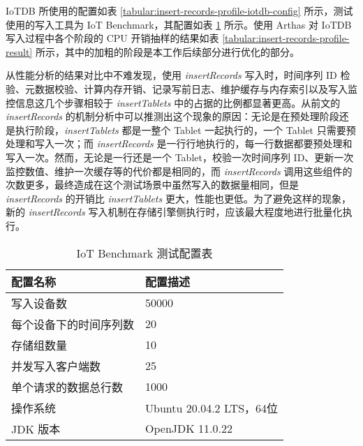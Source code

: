 IoTDB 所使用的配置如表 \ref{tabular:insert-records-profile-iotdb-config} 所示，测试使用的写入工具为 IoT Benchmark\cite{liu2019benchmarking}，其配置如表 \ref{tabular:insert-records-profile-benchmark-config} 所示。使用 Arthas 对 IoTDB 写入过程中各个阶段的 CPU 开销抽样的结果如表 \ref{tabular:insert-records-profile-result} 所示，其中的加粗的阶段是本工作后续部分进行优化的部分。

从性能分析的结果对比中不难发现，使用 \emph{insertRecords} 写入时，时间序列 ID 检验、元数据校验、计算内存开销、记录写前日志、维护缓存与内存索引以及写入监控信息这几个步骤相较于 \emph{insertTablets} 中的占据的比例都显著更高。从前文的 \emph{insertRecords} 的机制分析中可以推测出这个现象的原因：无论是在预处理阶段还是执行阶段，\emph{insertTablets} 都是一整个 Tablet 一起执行的，一个 Tablet 只需要预处理和写入一次；而 \emph{insertRecords} 是一行行地执行的，每一行数据都要预处理和写入一次。然而，无论是一行还是一个 Tablet，校验一次时间序列 ID、更新一次监控数值、维护一次缓存等的代价都是相同的，而 \emph{insertRecords} 调用这些组件的次数更多，最终造成在这个测试场景中虽然写入的数据量相同，但是 \emph{insertRecords} 的开销比 \emph{insertTablets} 更大，性能也更低。为了避免这样的现象，新的 \emph{insertRecords} 写入机制在存储引擎侧执行时，应该最大程度地进行批量化执行。
\begin{table}
  \caption{IoT Benchmark 测试配置表}
  \centering
  \begin{tabular}{ll}
  \toprule
  配置名称 & 配置描述 \\
  \midrule
      写入设备数 &  50000 \\ 
      每个设备下的时间序列数 & 20 \\ 
      存储组数量 & 10 \\ 
      并发写入客户端数 & 25 \\ 
      单个请求的数据总行数 &  1000 \\ 
      操作系统 & Ubuntu 20.04.2 LTS，64位 \\
      JDK 版本 & OpenJDK 11.0.22 \\
  \bottomrule
  \end{tabular}
  \label{tabular:insert-records-profile-benchmark-config}
\end{table}

